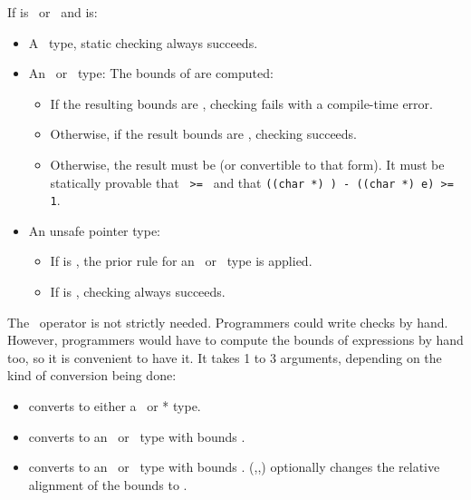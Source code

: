 If  is \ptrvoid\ or \unsafeptrvoid\ and  is:
\begin{itemize}
\item A \ptr\ type, static checking always succeeds.
\item An \arrayptr\ or \spanptr\ type: The bounds of  are computed:
\begin{itemize}
\item If the resulting bounds are \boundsnone, checking fails with a compile-time
error.
\item Otherwise, if the result bounds are \boundsany, checking 
succeeds.
\item Otherwise, the result must be  (or convertible
to that form).   It must be statically provable that \texttt{ >= }
and that {\texttt{((char *) ) - ((char *) e) >= 1}}.   
\end{itemize}
\item An unsafe pointer type:
\begin{itemize}
\item If  is \ptrvoid, the prior rule for an \arrayptr\ or \spanptr\ type is
applied.
\item If  is \unsafeptrvoid, checking always succeeds.
\end{itemize}
\end{itemize}

The \dynamicboundscast\ operator is not strictly needed.
Programmers could write checks by hand.  However, programmers
would have to compute the bounds of expressions by hand too, so it is convenient to
have it. It takes 1 to 3 arguments, depending on the kind of conversion being done:
\begin{itemize}
\item
  converts  to either a \ptr\ or * type.
\item
   converts  to an \arrayptr\ or
  \spanptr\ type with bounds .  
\item
   converts  to an
  \arrayptr\ or \spanptr\ type with bounds
  .  
  {(,,)}
   optionally changes the relative alignment of the bounds to .
\end{itemize}

